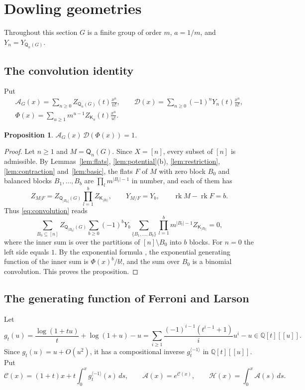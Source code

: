 \documentclass[11pt]{amsart}
\newtheorem{proposition}[theorem]{Proposition}
\theoremstyle{definition}
\theoremstyle{remark}
\numberwithin{equation}{section}
\newcommand{\Q}{\mathsf{Q}}
\newcommand{\K}{\mathsf{K}}
\newcommand{\rk}{\operatorname{rk}}
\begin{document}
\section{Dowling geometries}\label{sec:dowling}

Throughout this section $G$ is a finite group of order $m$, $a=1/m$, and $Y_n=Y_{\Q_n(G)}$.

\subsection{The convolution identity}
Put
\begin{gather*}
\mathcal{A}_G(x)=\sum_{n\ge0}Z_{\Q_n(G)}(t)\frac{x^n}{n!},\qquad\mathcal{D}(x)=\sum_{n\ge0}(-1)^nY_n(t)\frac{x^n}{n!},\\
\Phi(x)=\sum_{u\ge1}m^{u-1}Z_{\K_u}(t)\frac{x^u}{u!}.
\end{gather*}

\begin{proposition}\label{prop:convolution}
$\mathcal{A}_G(x)\,\mathcal{D}(\Phi(x))=1$.
\end{proposition}

\begin{proof}
Let $n\ge1$ and $M=\Q_n(G)$. Since $X=[n]$, every subset of $[n]$ is admissible. By Lemmas~\ref{lem:flats}, \ref{lem:potential}(b), \ref{lem:restriction}, \ref{lem:contraction} and~\ref{lem:basic}, the flats $F$ of $M$ with zero block $B_0$ and balanced blocks $B_1,\dots,B_b$ are $\prod_lm^{|B_l|-1}$ in number, and each of them has
\[
Z_{M|F}=Z_{\Q_{|B_0|}(G)}\prod_{l=1}^bZ_{\K_{|B_l|}},\qquad Y_{M/F}=Y_b,\qquad\rk M-\rk F=b.
\]
Thus \eqref{eq:convolution} reads
\[
\sum_{B_0\subseteq[n]}Z_{\Q_{|B_0|}(G)}\sum_{b\ge0}(-1)^bY_b\sum_{\{B_1,\dots,B_b\}}\prod_{l=1}^bm^{|B_l|-1}Z_{\K_{|B_l|}}=0,
\]
where the inner sum is over the partitions of $[n]\setminus B_0$ into $b$ blocks. For $n=0$ the left side equals $1$. By the exponential formula \cite[Section~5.1]{Sta99}, the exponential generating function of the inner sum is $\Phi(x)^b/b!$, and the sum over $B_0$ is a binomial convolution. This proves the proposition.
\end{proof}

\subsection{The generating function of Ferroni and Larson}
Let
\[
g_t(u)=\frac{\log(1+tu)}{t}+\log(1+u)-u=\sum_{i\ge1}\frac{(-1)^{i-1}(t^{i-1}+1)}{i}u^i-u\in\mathbb{Q}[t][[u]].
\]
Since $g_t(u)=u+O(u^2)$, it has a compositional inverse $g_t^{\langle-1\rangle}$ in $\mathbb{Q}[t][[u]]$. Put
\[
\mathcal{C}(x)=(1+t)x+t\int_0^xg_t^{\langle-1\rangle}(s)\,ds,\qquad\mathcal{A}(x)=e^{\mathcal{C}(x)},\qquad\mathcal{H}(x)=\int_0^x\mathcal{A}(s)\,ds.
\]
\end{document}
